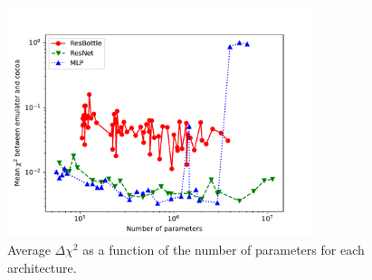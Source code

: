 \begin{figure}[htb]
	\centering
	\includegraphics[width=0.8\textwidth]{plots/avg_chi2_v_n_params_new.pdf}
	\caption{Average $\Delta\chi^2$ as a function of the number of parameters for each architecture.}
	\label{fig:avg_chi2_nparams}
\end{figure}


